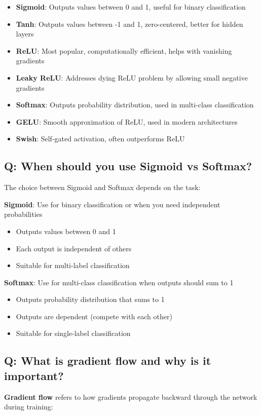 \begin{itemize}
	\item \textbf{Sigmoid}: Outputs values between 0 and 1, useful for binary classification
	\item \textbf{Tanh}: Outputs values between -1 and 1, zero-centered, better for hidden layers
	\item \textbf{ReLU}: Most popular, computationally efficient, helps with vanishing gradients
	\item \textbf{Leaky ReLU}: Addresses dying ReLU problem by allowing small negative gradients
	\item \textbf{Softmax}: Outputs probability distribution, used in multi-class classification
	\item \textbf{GELU}: Smooth approximation of ReLU, used in modern architectures
	\item \textbf{Swish}: Self-gated activation, often outperforms ReLU
\end{itemize}

\subsection*{\textcolor{primaryteal}{Q: When should you use Sigmoid vs Softmax?}}
The choice between Sigmoid and Softmax depends on the task:

\textbf{Sigmoid}: Use for binary classification or when you need independent probabilities
\begin{itemize}
	\item Outputs values between 0 and 1
	\item Each output is independent of others
	\item Suitable for multi-label classification
\end{itemize}

\textbf{Softmax}: Use for multi-class classification when outputs should sum to 1
\begin{itemize}
	\item Outputs probability distribution that sums to 1
	\item Outputs are dependent (compete with each other)
	\item Suitable for single-label classification
\end{itemize}

\subsection*{\textcolor{primaryteal}{Q: What is gradient flow and why is it important?}}
\textbf{Gradient flow} refers to how gradients propagate backward through the network during training:

